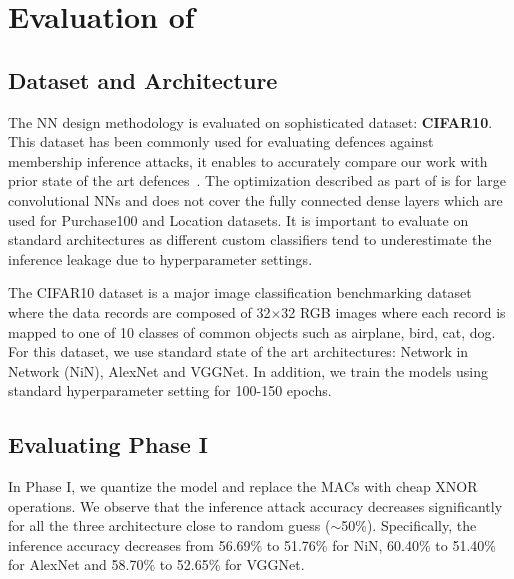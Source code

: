 \section{Evaluation of \method}\label{compare}




\subsection{Dataset and Architecture}


The \method\hspace{0.02in} NN design methodology is evaluated on sophisticated dataset: \textbf{CIFAR10}. This dataset has been commonly used for evaluating defences against membership inference attacks, it enables to accurately compare our work with prior state of the art defences~\cite{Abadi:2016:DLD:2976749.2978318,10.1145/3319535.3363201,DBLP:conf/ccs/NasrSH18}.
The optimization described as part of \method\hspace{0.02in} is for large convolutional NNs and does not cover the fully connected dense layers %
which are used for Purchase100 and Location datasets.
It is important to evaluate on standard architectures as different custom classifiers tend to underestimate the inference leakage due to hyperparameter settings.

The CIFAR10 dataset is a major image classification benchmarking dataset where the data records are composed of 32$\times$32 RGB images where each record is mapped to one of 10 classes of common objects such as airplane, bird, cat, dog.
For this dataset, we use standard state of the art architectures: Network in Network (NiN), AlexNet and VGGNet. In addition, we train the models using standard hyperparameter setting for 100-150 epochs.



\subsection{Evaluating Phase I}

In Phase I, we quantize the model and replace the MACs with cheap XNOR operations.
We observe that the inference attack accuracy decreases significantly for all the three architecture close to random guess ($\sim$50\%).
Specifically, the inference accuracy decreases from 56.69\% to 51.76\% for NiN, 60.40\% to 51.40\% for AlexNet and 58.70\% to 52.65\% for VGGNet.


